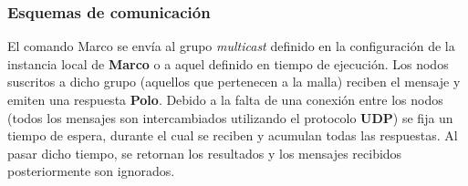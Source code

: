 \subsubsection{Esquemas de comunicación}



El comando Marco se envía al grupo \textit{multicast} definido en la configuración de la instancia local de \textbf{Marco} o a aquel definido en tiempo de ejecución. Los nodos suscritos a dicho grupo (aquellos que pertenecen a la malla) reciben el mensaje y emiten una respuesta \textbf{Polo}. Debido a la falta de una conexión entre los nodos (todos los mensajes son intercambiados utilizando el protocolo \textbf{UDP}) se fija un tiempo de espera, durante el cual se reciben y acumulan todas las respuestas. Al pasar dicho tiempo, se retornan los resultados y los mensajes recibidos posteriormente son ignorados.



